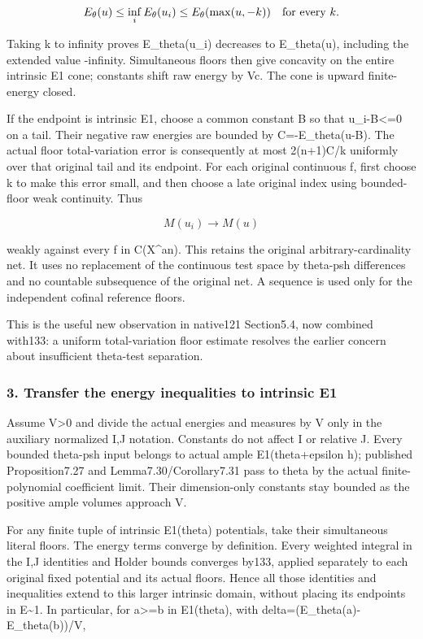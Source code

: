 \documentclass[
  10pt,
]{article}
\begin{document}
\[E_\theta(u)\le\inf_i E_\theta(u_i)
\le E_\theta(\max(u,-k))\quad\hbox{for every }k.\]

Taking k to infinity proves E\_theta(u\_i) decreases to E\_theta(u),
including the extended value -infinity. Simultaneous floors then give
concavity on the entire intrinsic E1 cone; constants shift raw energy by
Vc. The cone is upward finite-energy closed.

If the endpoint is intrinsic E1, choose a common constant B so that
u\_i-B\textless=0 on a tail. Their negative raw energies are bounded by
C=-E\_theta(u-B). The actual floor total-variation error is consequently
at most 2(n+1)C/k uniformly over that original tail and its endpoint.
For each original continuous f, first choose k to make this error small,
and then choose a late original index using bounded-floor weak
continuity. Thus

\[M(u_i)\longrightarrow M(u)\]

weakly against every f in C(X\^{}an). This retains the original
arbitrary-cardinality net. It uses no replacement of the continuous test
space by theta-psh differences and no countable subsequence of the
original net. A sequence is used only for the independent cofinal
reference floors.

This is the useful new observation in native121 Section5.4, now combined
with133: a uniform total-variation floor estimate resolves the earlier
concern about insufficient theta-test separation.

\subsubsection{3. Transfer the energy inequalities to intrinsic
E1}\label{transfer-the-energy-inequalities-to-intrinsic-e1}

Assume V\textgreater0 and divide the actual energies and measures by V
only in the auxiliary normalized I,J notation. Constants do not affect I
or relative J. Every bounded theta-psh input belongs to actual ample
E1(theta+epsilon h); published Proposition7.27 and
Lemma7.30/Corollary7.31 pass to theta by the actual finite-polynomial
coefficient limit. Their dimension-only constants stay bounded as the
positive ample volumes approach V.

For any finite tuple of intrinsic E1(theta) potentials, take their
simultaneous literal floors. The energy terms converge by definition.
Every weighted integral in the I,J identities and Holder bounds
converges by133, applied separately to each original fixed potential and
its actual floors. Hence all those identities and inequalities extend to
this larger intrinsic domain, without placing its endpoints in
E\textasciitilde1. In particular, for a\textgreater=b in E1(theta), with
delta=(E\_theta(a)-E\_theta(b))/V,
\end{document}
